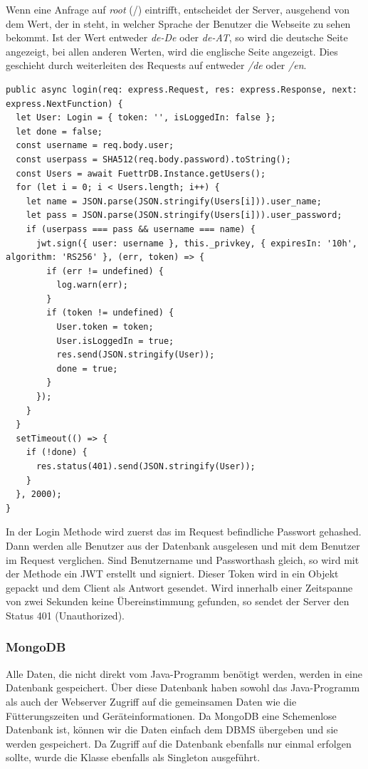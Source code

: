 Wenn eine Anfrage auf \textit{root} (/) eintrifft, entscheidet der Server, ausgehend von dem Wert, der in  steht, in welcher Sprache der Benutzer die Webseite zu sehen bekommt. Ist der Wert entweder \textit{de-De} oder \textit{de-AT}, so wird die deutsche Seite angezeigt, bei allen anderen Werten, wird die englische Seite angezeigt. Dies geschieht durch weiterleiten des Requests auf entweder \textit{/de} oder \textit{/en}. 

\begin{lstlisting}[style=TS,caption=Login Methode,label=login]
public async login(req: express.Request, res: express.Response, next: express.NextFunction) {
  let User: Login = { token: '', isLoggedIn: false };
  let done = false;
  const username = req.body.user;
  const userpass = SHA512(req.body.password).toString();
  const Users = await FuettrDB.Instance.getUsers();
  for (let i = 0; i < Users.length; i++) {
    let name = JSON.parse(JSON.stringify(Users[i])).user_name;
    let pass = JSON.parse(JSON.stringify(Users[i])).user_password;
    if (userpass === pass && username === name) {
      jwt.sign({ user: username }, this._privkey, { expiresIn: '10h', algorithm: 'RS256' }, (err, token) => {
        if (err != undefined) {
          log.warn(err);
        }
        if (token != undefined) {
          User.token = token;
          User.isLoggedIn = true;
          res.send(JSON.stringify(User));
          done = true;
        }
      });
    }
  }
  setTimeout(() => {
    if (!done) {
      res.status(401).send(JSON.stringify(User));
    }
  }, 2000);
}
\end{lstlisting}

In der Login Methode wird zuerst das im Request befindliche Passwort gehashed. Dann werden alle Benutzer aus der Datenbank ausgelesen und mit dem Benutzer im Request verglichen. Sind Benutzername und Passworthash gleich, so wird mit der Methode  ein \ac{JWT} erstellt und signiert. Dieser Token wird in ein Objekt gepackt und dem Client als Antwort gesendet. Wird innerhalb einer Zeitspanne von zwei Sekunden keine Übereinstimmung gefunden, so sendet der Server den Status 401 (Unauthorized). 




\subsubsection{MongoDB}
\label{sec:ums-server-mongo}
Alle Daten, die nicht direkt vom Java-Programm benötigt werden, werden in eine Datenbank gespeichert. Über diese Datenbank haben sowohl das Java-Programm als auch der Webserver Zugriff auf die gemeinsamen Daten wie die Fütterungszeiten und Geräteinformationen. Da MongoDB eine Schemenlose Datenbank ist, können wir die Daten einfach dem \ac{DBMS} übergeben und sie werden gespeichert. Da Zugriff auf die Datenbank ebenfalls nur einmal erfolgen sollte, wurde die Klasse ebenfalls als Singleton ausgeführt. 

